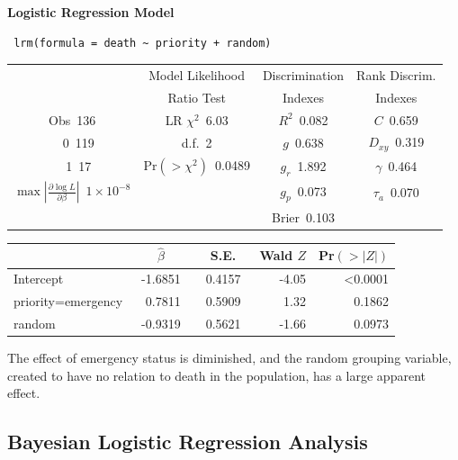  \centerline{\textbf{Logistic Regression Model}}
 
 \begin{verbatim}
 lrm(formula = death ~ priority + random)
 \end{verbatim}
 
 {\selectfont \begin{center}\begin{tabular}{|c|c|c|c|}\hline
&Model Likelihood&Discrimination&Rank Discrim.\\
&Ratio Test&Indexes&Indexes\\\hline
Obs~\hfill 136&LR $\chi^{2}$~\hfill 6.03&$R^{2}$~\hfill 0.082&$C$~\hfill 0.659\\
~~0~\hfill 119&d.f.~\hfill 2&$g$~\hfill 0.638&$D_{xy}$~\hfill 0.319\\
~~1~\hfill 17&Pr$(>\chi^{2})$~\hfill 0.0489&$g_{r}$~\hfill 1.892&$\gamma$~\hfill 0.464\\
$\max|\frac{\partial\log L}{\partial \beta}|$~\hfill $1\!\times\!10^{-8}$&&$g_{p}$~\hfill 0.073&$\tau_{a}$~\hfill 0.070\\
&&Brier~\hfill 0.103&\\
\hline
\end{tabular}
\end{center}}
 
 \setlongtables\begin{longtable}{lrrrr}\hline
 \multicolumn{1}{l}{}&\multicolumn{1}{c}{$\hat{\beta}$}&\multicolumn{1}{c}{S.E.}&\multicolumn{1}{c}{Wald $Z$}&\multicolumn{1}{c}{Pr$(>|Z|)$}\tabularnewline
 \hline
 \endhead
 \hline
 \endfoot
 Intercept&~-1.6851~&~0.4157~&-4.05&\textless 0.0001\tabularnewline
 priority=emergency&~ 0.7811~&~0.5909~& 1.32&0.1862\tabularnewline
 random&~-0.9319~&~0.5621~&-1.66&0.0973\tabularnewline
 \hline
 \end{longtable}
 \addtocounter{table}{-1}


The effect of emergency status is diminished, and the random grouping variable, created to have no relation to death in the population, has a large apparent effect.

\subsection{Bayesian Logistic Regression Analysis}

